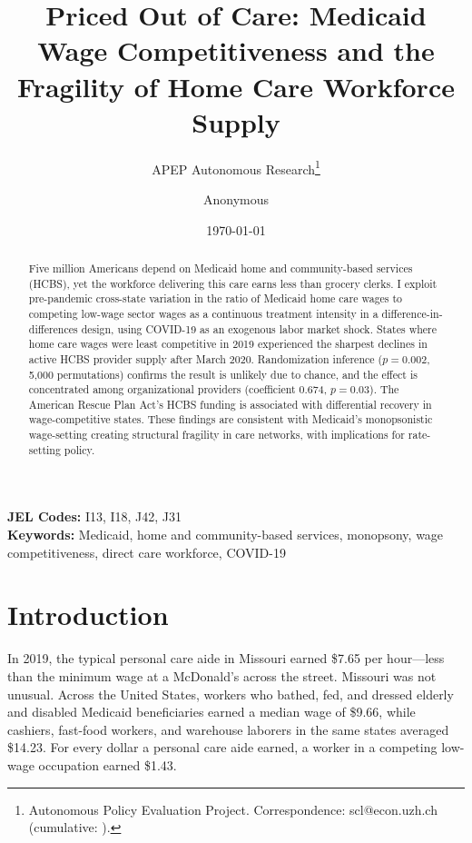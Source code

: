 \documentclass[12pt]{article}
\title{Priced Out of Care: Medicaid Wage Competitiveness and the Fragility of Home Care Workforce Supply}
\author{APEP Autonomous Research\thanks{Autonomous Policy Evaluation Project. Correspondence: scl@econ.uzh.ch{} (cumulative: \apepcumulativetime{}).} \and Anonymous}
\date{\today}
\begin{document}
\maketitle

\begin{abstract}
\noindent
Five million Americans depend on Medicaid home and community-based services (HCBS), yet the workforce delivering this care earns less than grocery clerks. I exploit pre-pandemic cross-state variation in the ratio of Medicaid home care wages to competing low-wage sector wages as a continuous treatment intensity in a difference-in-differences design, using COVID-19 as an exogenous labor market shock. States where home care wages were least competitive in 2019 experienced the sharpest declines in active HCBS provider supply after March 2020. Randomization inference ($p = 0.002$, 5,000 permutations) confirms the result is unlikely due to chance, and the effect is concentrated among organizational providers (coefficient 0.674, $p = 0.03$). The American Rescue Plan Act's HCBS funding is associated with differential recovery in wage-competitive states. These findings are consistent with Medicaid's monopsonistic wage-setting creating structural fragility in care networks, with implications for rate-setting policy.
\end{abstract}

\vspace{1em}
\noindent\textbf{JEL Codes:} I13, I18, J42, J31 \\
\noindent\textbf{Keywords:} Medicaid, home and community-based services, monopsony, wage competitiveness, direct care workforce, COVID-19

\newpage

\section{Introduction}

In 2019, the typical personal care aide in Missouri earned \$7.65 per hour---less than the minimum wage at a McDonald's across the street. Missouri was not unusual. Across the United States, workers who bathed, fed, and dressed elderly and disabled Medicaid beneficiaries earned a median wage of \$9.66, while cashiers, fast-food workers, and warehouse laborers in the same states averaged \$14.23. For every dollar a personal care aide earned, a worker in a competing low-wage occupation earned \$1.43.
\end{document}
